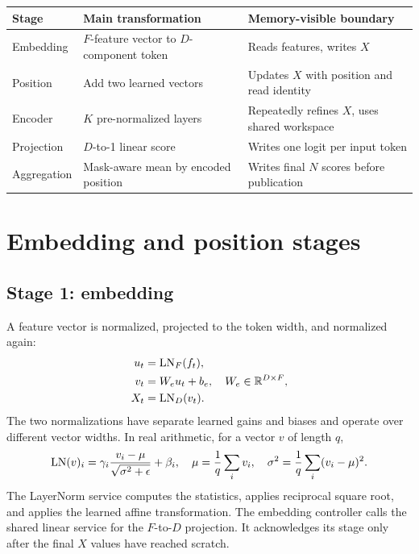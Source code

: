 {\smalltbl
\begin{tabularx}{\linewidth}{@{}P{29mm}P{46mm}Y@{}}
\toprule
Stage & Main transformation & Memory-visible boundary\\ \midrule
Embedding & \(F\)-feature vector to \(D\)-component token & Reads features, writes \(X\)\\
Position & Add two learned vectors & Updates \(X\) with position and read identity\\
Encoder & \(K\) pre-normalized layers & Repeatedly refines \(X\), uses shared workspace\\
Projection & \(D\)-to-1 linear score & Writes one logit per input token\\
Aggregation & Mask-aware mean by encoded position & Writes final \(N\) scores before publication\\
\bottomrule
\end{tabularx}}
\clearpage

\section{Embedding and position stages}
\subsection{Stage 1: embedding}
A feature vector is normalized, projected to the token width, and normalized again:
\begin{align}
u_t &= \operatorname{LN}_F(f_t),\\
v_t &= W_e u_t + b_e,\quad W_e\in\mathbb R^{D\times F},\\
X_t &= \operatorname{LN}_D(v_t).
\end{align}
The two normalizations have separate learned gains and biases and operate over different vector widths. In real arithmetic, for a vector \(v\) of length \(q\),
\[
\operatorname{LN}(v)_i=\gamma_i\frac{v_i-\mu}{\sqrt{\sigma^2+\epsilon}}+\beta_i,\quad
\mu=\frac{1}{q}\sum_i v_i,\quad
\sigma^2=\frac{1}{q}\sum_i(v_i-\mu)^2 .
\]
The LayerNorm service computes the statistics, applies reciprocal square root, and applies the learned affine transformation. The embedding controller calls the shared linear service for the \(F\)-to-\(D\) projection. It acknowledges its stage only after the final \(X\) values have reached scratch.

